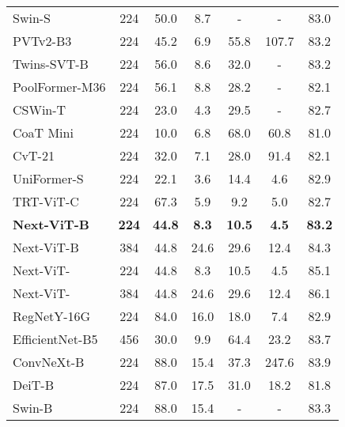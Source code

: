 \documentclass[10pt,twocolumn,letterpaper]{article}
\begin{document}
\begin{table}[]
{\begin{tabular}{l|c|cc|cc|c}
    Swin-S\cite{Swin}            &224  & 50.0      & 8.7       & -   & -      & 83.0        \\
    PVTv2-B3\cite{PVT_v2}          &224    &45.2   &6.9  & 55.8    &  107.7      & 83.2        \\
    Twins-SVT-B\cite{Twins}        &224    & 56.0      & 8.6       & 32.0    & -     & 83.2        \\
    PoolFormer-M36\cite{metaformer}     &224  & 56.1      & 8.8       &28.2          &  -     & 82.1        \\
    CSWin-T\cite{CSWin}            &224     & 23.0      & 4.3       & 29.5     & -     & 82.7        \\
    CoaT Mini\cite{CoaT}          &224  & 10.0      & 6.8       & 68.0     & 60.8          & 81.0        \\
    CvT-21\cite{CvT}       &224     & 32.0      & 7.1       & 28.0     & 91.4          & 82.1        \\
    UniFormer-S\cite{uniformer}       &224  & 22.1      & 3.6       & 14.4         & 4.6      & 82.9       \\
    TRT-ViT-C\cite{xia2022trt}         &224  & 67.3      & 5.9       & 9.2         & 5.0      & 82.7        \\
    \textbf{Next-ViT-B}     &\textbf{224}  & \textbf{44.8}  & \textbf{8.3} & \textbf{10.5}    & \textbf{4.5}        & \textbf{83.2}        \\  
    Next-ViT-B     &384   & 44.8      & 24.6       & 29.6   & 12.4          & 84.3        \\
    Next-ViT-     &224   & 44.8      & 8.3       & 10.5   & 4.5          & 85.1        \\
    Next-ViT-     &384   & 44.8      & 24.6       & 29.6   & 12.4          & 86.1        \\
    \midrule 
    RegNetY-16G \cite{RegNet}        &224   & 84.0      & 16.0      & 18.0      & 7.4   & 82.9          \\
    EfficientNet-B5\cite{EfficientNet}        &456           & 30.0      & 9.9      & 64.4      & 23.2   & 83.7          \\
    ConvNeXt-B \cite{ConvNext}             &224        & 88.0      & 15.4       & 37.3      & 247.6    & 83.9          \\
    DeiT-B \cite{Deit}                 &224             & 87.0      & 17.5      & 31.0    & 18.2       & 81.8        \\
    Swin-B \cite{Swin}                 &224             & 88.0      & 15.4      & -    & -      & 83.3        \\

\end{tabular}}
\end{table}
\end{document}
